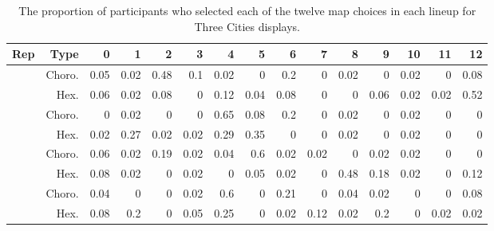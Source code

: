 \documentclass{monashthesis}
\begin{document}
\begin{Shaded}
\end{Shaded}

\begin{table}

\caption{\label{tab:choice-three}The proportion of participants who selected each of the twelve map choices in each lineup for Three Cities displays.}
\centering
\begin{tabular}[t]{r|r|r|r|r|r|r|r|r|r|r|r|r|r|r}
\hline
Rep & Type & 0 & 1 & 2 & 3 & 4 & 5 & 6 & 7 & 8 & 9 & 10 & 11 & 12\\
\hline
 & Choro. & 0.05 & 0.02 & 0.48 & 0.1 & 0.02 & 0 & 0.2 & 0 & 0.02 & 0 & 0.02 & 0 & 0.08\\
\cline{2-15}
\multirow{-2}{*}{\raggedleft\arraybackslash 1} & Hex. & 0.06 & 0.02 & 0.08 & 0 & 0.12 & 0.04 & 0.08 & 0 & 0 & 0.06 & 0.02 & 0.02 & 0.52\\
\cline{1-15}
 & Choro. & 0 & 0.02 & 0 & 0 & 0.65 & 0.08 & 0.2 & 0 & 0.02 & 0 & 0.02 & 0 & 0\\
\cline{2-15}
\multirow{-2}{*}{\raggedleft\arraybackslash 2} & Hex. & 0.02 & 0.27 & 0.02 & 0.02 & 0.29 & 0.35 & 0 & 0 & 0.02 & 0 & 0.02 & 0 & 0\\
\cline{1-15}
 & Choro. & 0.06 & 0.02 & 0.19 & 0.02 & 0.04 & 0.6 & 0.02 & 0.02 & 0 & 0.02 & 0.02 & 0 & 0\\
\cline{2-15}
\multirow{-2}{*}{\raggedleft\arraybackslash 3} & Hex. & 0.08 & 0.02 & 0 & 0.02 & 0 & 0.05 & 0.02 & 0 & 0.48 & 0.18 & 0.02 & 0 & 0.12\\
\cline{1-15}
 & Choro. & 0.04 & 0 & 0 & 0.02 & 0.6 & 0 & 0.21 & 0 & 0.04 & 0.02 & 0 & 0 & 0.08\\
\cline{2-15}
\multirow{-2}{*}{\raggedleft\arraybackslash 4} & Hex. & 0.08 & 0.2 & 0 & 0.05 & 0.25 & 0 & 0.02 & 0.12 & 0.02 & 0.2 & 0 & 0.02 & 0.02\\
\hline
\end{tabular}
\end{table}
\end{document}
